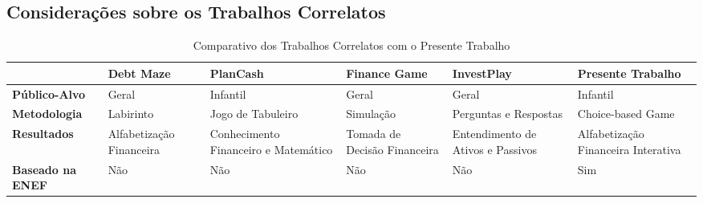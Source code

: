 \subsection{Considerações sobre os Trabalhos Correlatos}



\begin{table}[!htbp]
	\centering
	\renewcommand{\arraystretch}{1.3}
	\caption{Comparativo dos Trabalhos Correlatos com o Presente Trabalho}
	\label{tab:comparativo-trabalhos}
	\begin{tabular}{| L{2.5cm} | L{2.5cm} | L{2.5cm} | L{2.5cm} | L{2.5cm} | L{2.5cm} |}
		\hline
		\textbf{}                & \textbf{Debt Maze}       & \textbf{PlanCash}                    & \textbf{Finance Game}        & \textbf{InvestPlay}               & \textbf{Presente Trabalho}          \\
		\hline
		\hline
		\textbf{Público-Alvo}    & Geral                    & Infantil                             & Geral                        & Geral                             & Infantil                            \\
		\hline
		\textbf{Metodologia}     & Labirinto                & Jogo de Tabuleiro                    & Simulação                    & Perguntas e Respostas             & Choice-based Game                   \\
		\hline
		\textbf{Resultados}      & Alfabetização Financeira & Conhecimento Financeiro e Matemático & Tomada de Decisão Financeira & Entendimento de Ativos e Passivos & Alfabetização Financeira Interativa \\
		\hline
		\textbf{Baseado na ENEF} & Não                      & Não                                  & Não                          & Não                               & Sim                                 \\
		\hline
	\end{tabular}
	\vspace{2mm}
\end{table}
